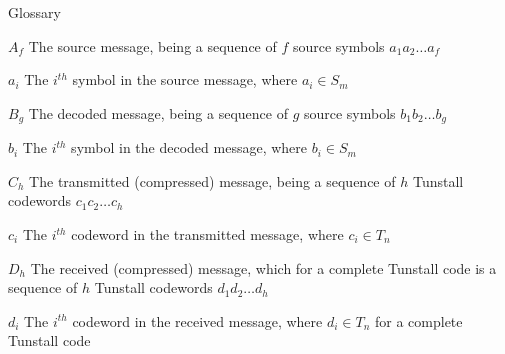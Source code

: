 
\begin{dictionary}{Glossary}
\item[$A_f$] The source message, being a sequence of $f$ source symbols $a_1 a_2 \ldots a_f$
\item[$a_i$] The $i^{th}$ symbol in the source message, where $a_i \in S_m$
\item[$B_g$] The decoded message, being a sequence of $g$ source symbols $b_1 b_2 \ldots b_g$
\item[$b_i$] The $i^{th}$ symbol in the decoded message, where $b_i \in S_m$
\item[$C_h$] The transmitted (compressed) message, being a sequence of $h$ Tunstall codewords $c_1 c_2 \ldots c_h$
\item[$c_i$] The $i^{th}$ codeword in the transmitted message, where $c_i \in T_n$
\item[$D_h$] The received (compressed) message, which for a complete Tunstall code is a sequence of $h$ Tunstall codewords $d_1 d_2 \ldots d_h$
\item[$d_i$] The $i^{th}$ codeword in the received message, where $d_i \in T_n$ for a complete Tunstall code
\end{dictionary}
